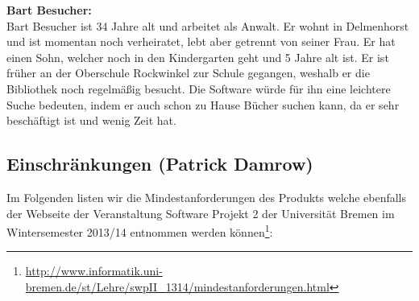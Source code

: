 \documentclass[fontsize=12pt,paper=a4,twoside]{scrartcl}
\begin{document}
\bigskip

\textbf{Bart Besucher:}\\
Bart Besucher ist 34 Jahre alt und arbeitet als Anwalt. Er wohnt in Delmenhorst und ist momentan noch verheiratet, lebt aber getrennt von seiner Frau. Er hat einen Sohn, welcher noch in den Kindergarten geht und 5 Jahre alt ist. Er ist früher an der Oberschule Rockwinkel zur Schule gegangen, weshalb er die Bibliothek noch regelmäßig besucht. Die Software würde für ihn eine leichtere Suche bedeuten, indem er auch schon zu Hause Bücher suchen kann, da er sehr beschäftigt ist und wenig Zeit hat.\\

\subsection{Einschränkungen (Patrick Damrow)}
\label{sec:Einschraenkungen}
Im Folgenden listen wir die Mindestanforderungen des Produkts welche ebenfalls der Webseite der Veranstaltung Software Projekt 2 der Universität Bremen im Wintersemester 2013/14 entnommen werden können\footnote{\url{http://www.informatik.uni-bremen.de/st/Lehre/swpII_1314/mindestanforderungen.html}}:
\end{document}
